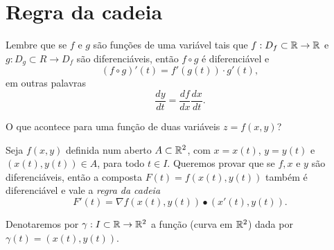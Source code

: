 \section{Regra da cadeia}

Lembre que se \(f\) e \(g\) são funções de uma variável tais que \(f:D_f\subset\mathbb{R} \to \mathbb{R}\) e \(g:D_g\subset R\to D_f\) são diferenciáveis, então \(f\circ g\) é diferenciável e \[(f\circ g)'(t) = f'(g(t))\cdot g'(t),\] em outras palavras \[\frac{dy}{dt} = \frac{df}{dx} \frac{dx}{dt}.\]

O que acontece para uma função de duas variáveis \(z = f(x,y)\)?

Seja \(f(x,y)\) definida num aberto \(A\subset\mathbb{R}^2\), com \(x = x(t)\), \(y = y(t)\) e \((x(t),y(t))\in A\), para todo \(t\in I\). Queremos provar que se \(f, x\) e \(y\) são diferenciáveis, então a composta \(F(t) = f(x(t),y(t))\) também é diferenciável e vale a \textit{regra da cadeia}
    \begin{equation}\label{eqn.RegraDaCadeia}
        F'(t) = \nabla f(x(t),y(t))\bullet(x'(t),y(t)).
    \end{equation}

Denotaremos por \(\gamma: I \subset \mathbb{R} \to \mathbb{R}^2\) a função (curva em \(\mathbb{R}^2\)) dada por \(\gamma(t) = (x(t),y(t))\).

